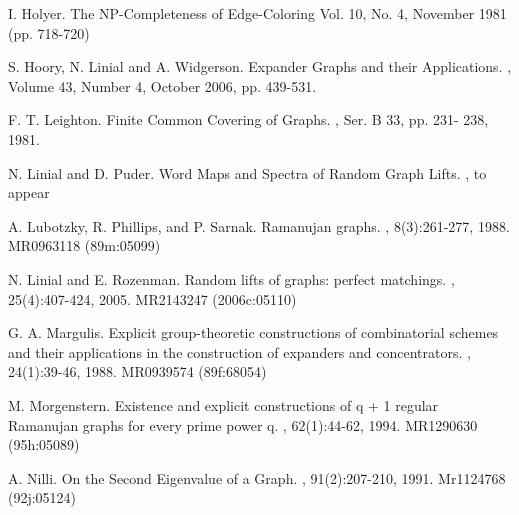 \documentclass[12pt]{article}
\newtheorem{open question}[theorem]{Open question}
\begin{document}
\begin{thebibliography}{FMT06}
I. Holyer.
\newblock The NP-Completeness of Edge-Coloring
 Vol. 10, No. 4, November 1981 (pp. 718-720)

S. Hoory, N. Linial and A. Widgerson.
\newblock Expander Graphs and their Applications.
, Volume 43, Number 4, October 2006, pp. 439-531.

F. T. Leighton.
\newblock Finite Common Covering of Graphs.
, Ser. B 33, pp. 231- 238, 1981.

N. Linial and D. Puder.
\newblock Word Maps and Spectra of Random Graph Lifts.
, to appear

A. Lubotzky, R. Phillips, and P. Sarnak.
\newblock Ramanujan graphs.
, 8(3):261-277, 1988. MR0963118 (89m:05099)

N. Linial and E. Rozenman.
\newblock Random lifts of graphs: perfect matchings.
, 25(4):407-424, 2005. MR2143247 (2006c:05110)

G. A. Margulis.
\newblock Explicit group-theoretic constructions of combinatorial schemes and their applications in the construction of expanders and concentrators.
, 24(1):39-46, 1988. MR0939574 (89f:68054)

M. Morgenstern.
\newblock Existence and explicit constructions of q + 1 regular Ramanujan graphs for every prime power q.
, 62(1):44-62, 1994. MR1290630 (95h:05089)

A. Nilli.
\newblock On the Second Eigenvalue of a Graph.
, 91(2):207-210, 1991. Mr1124768 (92j:05124)

\end{thebibliography}
\end{document}
